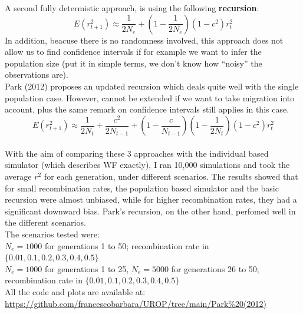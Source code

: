 \documentclass[a4paper,12pt]{article}
\begin{document}
A second fully determistic approach, is using the following \textbf{recursion}:\\
$$ E(r^2_{t+1}) \approx \frac{1}{2N_e} + (1 -  \frac{1}{2N_e}) (1- c^2) r^2_{t} $$
In addition, beacuse there is no randomness involved, this approach does not allow us to find confidence intervals if for example we want to infer the population size (put it in simple terms, we don’t know how “noisy” the observations are).\\

Park (2012) proposes an updated recursion which deals quite well with the single population case. However, cannot be extended if we want to take migration into account, plus the same remark on confidence intervals still applies in this case.\\
$$ E(r^2_{t+1}) \approx \frac{1}{2N_t} + \frac{c^2}{2N_{t-1}} + (1 - \frac{c}{N_{t-1}})(1 -  \frac{1}{2N_t}) (1- c^2) r^2_{t} $$ \\

With the aim of comparing these 3 approaches with the individual based simulator (which describes WF exactly), I ran 10,000 simulations and took the average $r^2$ for each generation, under different scenarios. The results showed that for small recombination rates, the population based simulator and the basic recursion were almost unbiased, while for higher recombination rates, they had a significant downward bias. Park's recursion, on the other hand, perfomed well in  the different scenarios.\\

The scenarios tested were:\\

 $N_e = 1000$ for generations 1 to 50; recombination rate in $\{0.01, 0.1, 0.2, 0.3, 0.4, 0.5\}$\\
 
 $N_e = 1000$ for generations 1 to 25, $N_e = 5000$ for generations 26 to 50; recombination rate in $\{0.01, 0.1, 0.2, 0.3, 0.4, 0.5\}$\\
 
All the code and plots are available at:\\
\url{https://github.com/francescobarbara/UROP/tree/main/Park%20(2012)}
\end{document}
